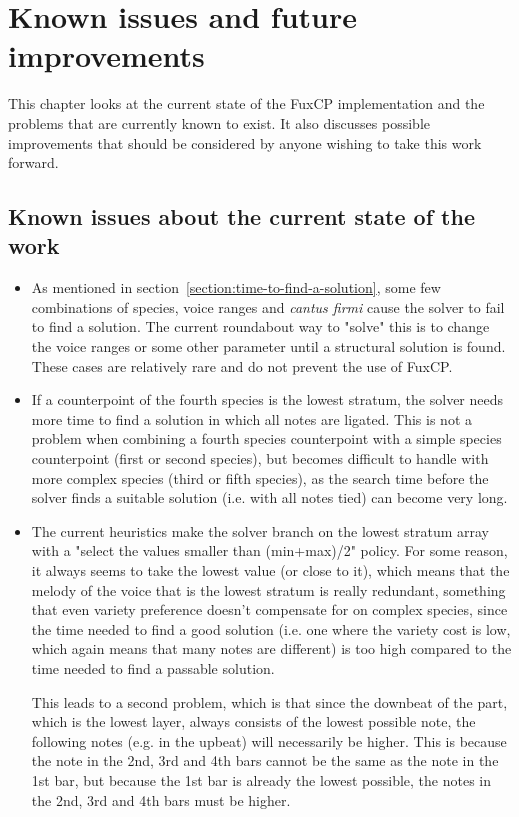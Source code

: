 \chapter{Known issues and future improvements}
This chapter looks at the current state of the FuxCP implementation and the problems that are currently known to exist. It also discusses possible improvements that should be considered by anyone wishing to take this work forward.

\section{Known issues about the current state of the work} \label{section:known-issues-about-the-current-state-of-the-work}
\begin{itemize}
  \item As mentioned in section~\ref{section:time-to-find-a-solution}, some few combinations of species, voice ranges and \textit{cantus firmi} cause the solver to fail to find a solution. The current roundabout way to "solve" this is to change the voice ranges or some other parameter until a structural solution is found. These cases are relatively rare and do not prevent the use of FuxCP.
  \item If a counterpoint of the fourth species is the lowest stratum, the solver needs more time to find a solution in which all notes are ligated. This is not a problem when combining a fourth species counterpoint with a simple species counterpoint (first or second species), but becomes difficult to handle with more complex species (third or fifth species), as the search time before the solver finds a suitable solution (i.e. with all notes tied) can become very long.
  \item The current heuristics make the solver branch on the lowest stratum array with a "select the values smaller than (min+max)/2" policy. For some reason, it always seems to take the lowest value (or close to it), which means that the melody of the voice that is the lowest stratum is really redundant, something that even variety preference doesn't compensate for on complex species, since the time needed to find a good solution (i.e. one where the variety cost is low, which again means that many notes are different) is too high compared to the time needed to find a passable solution.
  
  This leads to a second problem, which is that since the downbeat of the part, which is the lowest layer, always consists of the lowest possible note, the following notes (e.g. in the upbeat) will necessarily be higher. This is because the note in the 2nd, 3rd and 4th bars cannot be the same as the note in the 1st bar, but because the 1st bar is already the lowest possible, the notes in the 2nd, 3rd and 4th bars must be higher. 
  

\end{itemize}
